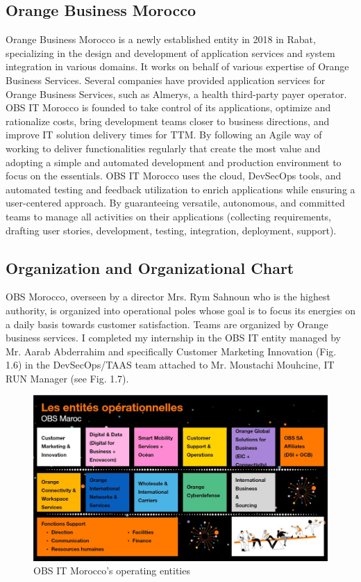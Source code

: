 \subsection{Orange Business Morocco}
Orange Business Morocco is a newly established entity in 2018 in Rabat, specializing in the design and development of application services and system integration in various domains. It works on behalf of various expertise of Orange Business Services. Several companies have provided application services for Orange Business Services, such as Almerys, a health third-party payer operator. OBS IT Morocco is founded to take control of its applications, optimize and rationalize costs, bring development teams closer to business directions, and improve IT solution delivery times for TTM. By following an Agile way of working to deliver functionalities regularly that create the most value and adopting a simple and automated development and production environment to focus on the essentials. OBS IT Morocco uses the cloud, DevSecOps tools, and automated testing and feedback utilization to enrich applications while ensuring a user-centered approach. By guaranteeing versatile, autonomous, and committed teams to manage all activities on their applications (collecting requirements, drafting user stories, development, testing, integration, deployment, support).

\subsection{Organization and Organizational Chart}
OBS Morocco, overseen by a director Mrs. Rym Sahnoun who is the highest authority, is organized into operational poles whose goal is to focus its energies on a daily basis towards customer satisfaction. Teams are organized by Orange business services. I completed my internship in the OBS IT entity managed by Mr. Aarab Abderrahim and specifically Customer Marketing Innovation (Fig. 1.6) in the DevSecOps/TAAS team attached to Mr. Moustachi Mouhcine, IT RUN Manager (see Fig. 1.7).

\begin{figure}[H]
  \centering
  \includegraphics[width=17.5cm]{Figures/entite.png}
  \caption{OBS IT Morocco's operating entities}
  \label{fig:vue-snoc-pos}
\end{figure}

